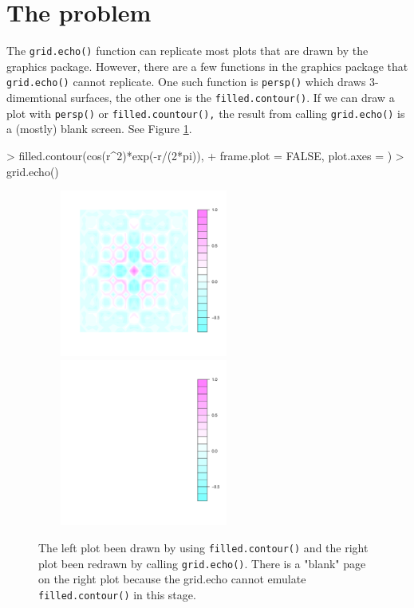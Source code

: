 \documentclass[11pt]{report}
\begin{document}
\section{The problem}
The \texttt{grid.echo()} function can replicate most plots that are drawn by the graphics package. However, there are a few functions in the graphics package that \texttt{grid.echo()} cannot replicate. One such function is \texttt{persp()} which draws 3-dimemtional surfaces, the other one is the \texttt{filled.contour()}. If we can draw a plot with \texttt{persp()} or \texttt{filled.countour(),} the result from calling \texttt{grid.echo()} is a (mostly) blank screen. See Figure \ref{figure_1.3}.
\begin{Schunk}
\begin{Sinput}
> filled.contour(cos(r^2)*exp(-r/(2*pi)), 
+                frame.plot = FALSE, plot.axes = {})
> grid.echo()
\end{Sinput}
\end{Schunk}
\begin{figure}[h]
	\begin{center}
		\includegraphics[height = 5.5cm, width = 7cm]{figure/report_fill_1}
		\includegraphics[height = 5.5cm, width = 7cm]{figure/report_fill_2}
		\caption{The left plot been drawn by using \texttt{filled.contour()} and the right plot been redrawn by calling \texttt{grid.echo()}. There is a "blank" page on the right plot because the grid.echo cannot emulate \texttt{filled.contour()} in this stage.}
		\label{figure_1.3}
	\end{center}
\end{figure}
\end{document}
